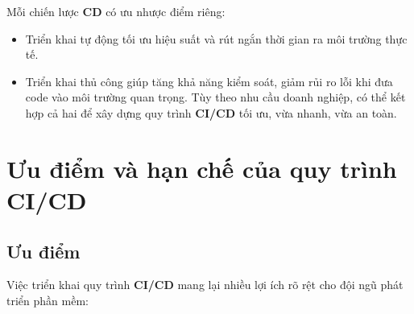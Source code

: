 Mỗi chiến lược \textbf{CD} có ưu nhược điểm riêng:
\begin{itemize}[label=\textendash] 
	\item 	Triển khai tự động tối ưu hiệu suất và rút ngắn thời gian ra môi trường thực tế.
	\item Triển khai thủ công giúp tăng khả năng kiểm soát, giảm rủi ro lỗi khi đưa code vào môi trường quan trọng.
	Tùy theo nhu cầu doanh nghiệp, có thể kết hợp cả hai để xây dựng quy trình \textbf{CI/CD} tối ưu, vừa nhanh, vừa an toàn.
\end{itemize}


\section{Ưu điểm và hạn chế của quy trình CI/CD}

\subsection*{Ưu điểm}

	Việc triển khai quy trình \textbf{CI/CD} mang lại nhiều lợi ích rõ rệt cho đội ngũ phát triển phần mềm:

